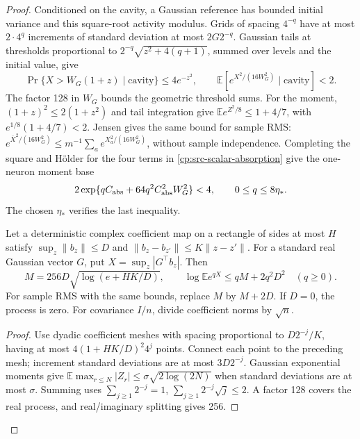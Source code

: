 \begin{proof}
Conditioned on the cavity, a Gaussian reference has bounded initial
variance and this square-root activity modulus.  Grids of spacing
\(4^{-q}\) have at most \(2\cdot4^q\) increments of standard
deviation at most \(2G2^{-q}\).  Gaussian tails at thresholds
proportional to \(2^{-q}\sqrt{z^2+4(q+1)}\), summed over levels
and the initial value, give
\[
 \Pr\{X>W_G(1+z)\mid\text{cavity}\}\le4e^{-z^2},\qquad
 \mathbb E[e^{X^2/(16W_G^2)}\mid\text{cavity}]<2.
\]
The factor 128 in \(W_G\) bounds the geometric threshold sums.
For the moment, \((1+z)^2\le2(1+z^2)\) and tail integration give
\(\mathbb E e^{Z^2/8}\le1+4/7\), with
\(e^{1/8}(1+4/7)<2\).  Jensen gives the same bound for sample RMS:
\(e^{\overline X^2/(16W_G^2)}\le
m^{-1}\sum_ae^{X_a^2/(16W_G^2)}\), without sample independence.
Completing the square and H\"older for the four terms in
\eqref{cp:src-scalar-absorption} give the one-neuron moment base
\begin{equation}
 2\exp\{qC_{\rm abs}+64q^2C_{\rm abs}^2W_G^2\}<4,
                    \qquad 0\le q\le8\eta_*.
 \label{cp:src-main-moment}
\end{equation}
The chosen \(\eta_*\) verifies the last inequality.

\begin{claim}
\label{cp:src-Gaussian}
Let a deterministic complex coefficient map on a rectangle of sides at
most \(H\) satisfy \(\sup_z\|b_z\|\le D\) and
\(\|b_z-b_{z'}\|\le K\|z-z'\|\).  For a standard real Gaussian
vector \(G\), put \(X=\sup_z|G^\top b_z|\).  Then
\[
 M=256D\sqrt{\log(e+HK/D)},\qquad
 \log\mathbb E e^{qX}\le qM+2q^2D^2\quad(q\ge0).
\]
For sample RMS with the same bounds, replace \(M\) by \(M+2D\).
If \(D=0\), the process is zero.  For covariance \(I/n\), divide
coefficient norms by \(\sqrt n\).
\end{claim}
\begin{proof}
Use dyadic coefficient meshes with spacing proportional to
\(D2^{-j}/K\), having at most \(4(1+HK/D)^2 4^j\) points.
Connect each point to the preceding mesh; increment standard deviations
are at most \(3D2^{-j}\).  Gaussian exponential moments give
\(\mathbb E\max_{r\le N}|Z_r|\le\sigma\sqrt{2\log(2N)}\)
when standard deviations are at most \(\sigma\).  Summing uses
\(\sum_{j\ge1}2^{-j}=1\), \(\sum_{j\ge1}2^{-j}\sqrt j\le2\).
A factor 128 covers the real process, and real/imaginary splitting
gives 256.


\end{proof}
\end{proof}
